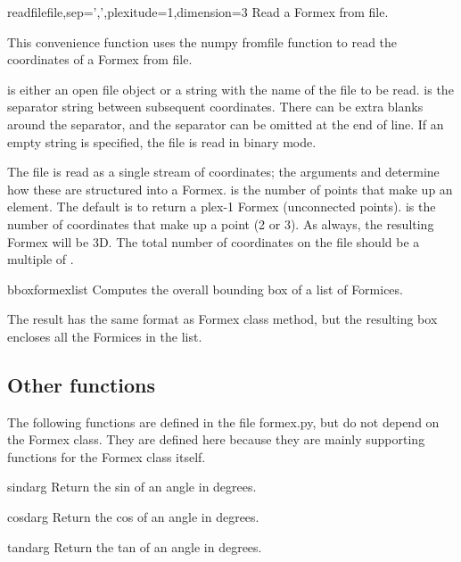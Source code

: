 \begin{funcdesc}{readfile}{file,sep=',',plexitude=1,dimension=3}
Read a Formex from file.

This convenience function uses the numpy fromfile function to read the coordinates of a Formex from file. 

 is either an open file object or a string with the name of the file to be read.
 is the separator string between subsequent coordinates. There can be extra blanks around the separator, and the separator can be omitted at the end of line. If an empty string is specified, the file is read in binary mode.

The file is read as a single stream of coordinates; the arguments  and  determine how these are structured into a Formex.
 is the number of points that make up an element. The default is to return a plex-1 Formex (unconnected points).
 is the number of coordinates that make up a point (2 or 3). As always, the resulting Formex will be 3D.
The total number of coordinates on the file should be a multiple of .
\end{funcdesc}


\begin{funcdesc}{bbox}{formexlist}
Computes the overall bounding box of a list of Formices.

The result has the same format as Formex class  method, but the resulting box encloses all the Formices in the list.
\end{funcdesc}



\subsection{Other functions}
The following functions are defined in the file formex.py, but do not depend on the Formex class. They are defined here because they are mainly supporting functions for the Formex class itself.


\begin{funcdesc}{sind}{arg}
    Return the sin of an angle in degrees.
\end{funcdesc}

\begin{funcdesc}{cosd}{arg}
    Return the cos of an angle in degrees.
\end{funcdesc}

\begin{funcdesc}{tand}{arg}
    Return the tan of an angle in degrees.
\end{funcdesc}

